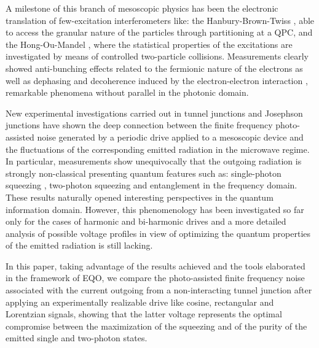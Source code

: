 \documentclass[twocolumn,showpacs,preprintnumbers,amsmath,amssymb%
 aps,
 prb,
 lengthcheck,%
]{revtex4-1}
\begin{document}
A milestone of this branch of mesoscopic physics has been the electronic translation of few-excitation interferometers like: the Hanbury-Brown-Twiss \cite{hanburybrown_test_1956}, able to access the granular nature of the particles through partitioning at a QPC, and the Hong-Ou-Mandel \cite{hong_measurement_1987}, where the statistical properties of the excitations are investigated by means of controlled two-particle collisions. Measurements clearly showed anti-bunching effects related to the fermionic nature of the electrons \cite{bocquillon_electron_2012a} as well as dephasing and decoherence induced by the electron-electron interaction \cite{bocquillon_coherence_2013, wahl_interactions_2014, ferraro_real_2014}, remarkable phenomena without parallel in the photonic domain.
 
 New experimental investigations carried out in tunnel junctions \cite{gasse_observation_2013, forgues_experimental_2015, Forgues16} and Josephson junctions \cite{Westig17} have shown the deep connection between the finite frequency photo-assisted noise generated by a periodic drive applied to a mesoscopic device and the fluctuations of the corresponding emitted radiation in the microwave regime. \cite{beenakker_counting_2001, beenakker_antibunched_2004, grimsmo_quantum_2016, Mora15b} In particular, measurements show unequivocally that the outgoing radiation is strongly non-classical presenting quantum features such as: single-photon squeezing \cite{gasse_observation_2013}, two-photon squeezing and entanglement in the frequency domain. \cite{forgues_experimental_2015} These results naturally opened interesting perspectives in the quantum information domain. \cite{braunstein_quantum_2016} However, this phenomenology has been investigated so far only for the cases of harmonic and bi-harmonic drives \cite{Gabelli17} and a more detailed analysis of possible voltage profiles in view of optimizing the quantum properties of the emitted radiation is still lacking. 

In this paper, taking advantage of the results achieved \cite{dubois_minimal_2013} and the tools \cite{dubois_integer_2013, rech_minimal_2016,Vannucci17,Ronetti17} elaborated in the framework of EQO, we compare  the photo-assisted finite frequency noise associated with the current outgoing from a non-interacting tunnel junction after applying an experimentally realizable drive like cosine, rectangular and Lorentzian signals, showing that the latter voltage represents the optimal compromise between the maximization of the squeezing and of the purity of the emitted single and two-photon states. 
\end{document}
